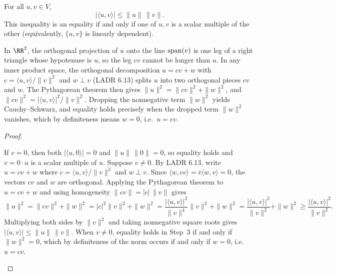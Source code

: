 \documentclass[10pt]{scrartcl}
\newcommand{\ip}[2]{\langle #1,#2\rangle}
\begin{document}
\begin{theorem*}
  For all $u,v\in V$,
  \[
    |\ip uv| \le \|u\|\,\|v\|.
  \]
  This inequality is an equality if and only if one of $u,v$ is a scalar multiple of the other (equivalently, $\{u,v\}$ is linearly dependent).
\end{theorem*}
\begin{ideabox}
  In $\RR^2$, the orthogonal projection of $u$ onto the line $\operatorname{span}(v)$ is one leg of a right triangle whose hypotenuse is $u$, so the leg $cv$ cannot be longer than $u$. In any inner product space, the orthogonal decomposition $u=cv+w$ with $c=\ip uv/\|v\|^2$ and $w\perp v$ (LADR 6.13) splits $u$ into two orthogonal pieces $cv$ and $w$. The Pythagorean theorem then gives $\|u\|^2=\|cv\|^2+\|w\|^2$, and $\|cv\|^2=|\ip uv|^2/\|v\|^2$. Dropping the nonnegative term $\|w\|^2$ yields Cauchy--Schwarz, and equality holds precisely when the dropped term $\|w\|^2$ vanishes, which by definiteness means $w=0$, i.e.\ $u=cv$.
\end{ideabox}
\begin{proof}
  \begin{steps}
    \ii If $v=0$, then both $|\ip u0|=0$ and $\|u\|\,\|0\|=0$, so equality holds and $v=0\cdot u$ is a scalar multiple of $u$.
    \ii Suppose $v\ne 0$. By LADR 6.13, write $u=cv+w$ where $c=\ip uv/\|v\|^2$ and $w\perp v$. Since $\ip w{cv}=\bar c\ip wv=0$, the vectors $cv$ and $w$ are orthogonal.
    \ii Applying the Pythagorean theorem to $u=cv+w$ and using homogeneity $\|cv\|=|c|\,\|v\|$ gives
    \[
      \|u\|^2 = \|cv\|^2 + \|w\|^2 = |c|^2\|v\|^2 + \|w\|^2 = \frac{|\ip uv|^2}{\|v\|^4}\|v\|^2 + \|w\|^2 = \frac{|\ip uv|^2}{\|v\|^2} + \|w\|^2 \ge \frac{|\ip uv|^2}{\|v\|^2}.
    \]
    \ii Multiplying both sides by $\|v\|^2$ and taking nonnegative square roots gives $|\ip uv|\le \|u\|\,\|v\|$.
    \ii When $v\ne 0$, equality holds in Step~3 if and only if $\|w\|^2=0$, which by definiteness of the norm occurs if and only if $w=0$, i.e.\ $u=cv$.
  \end{steps}
\end{proof}
\end{document}
